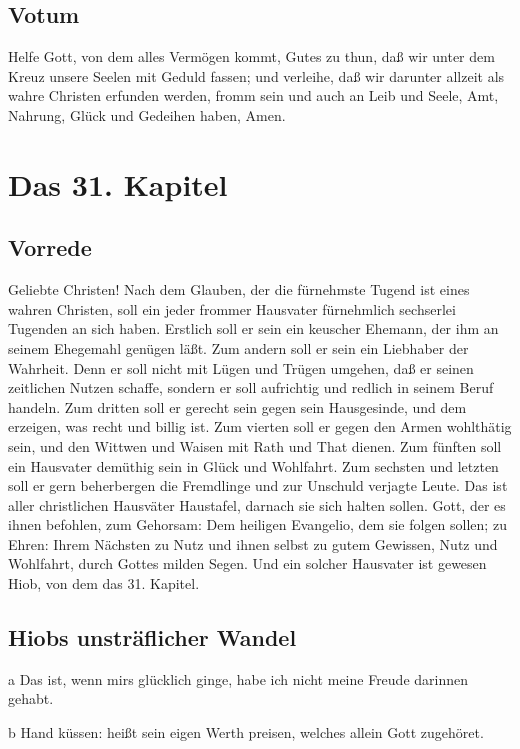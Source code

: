 \section{Votum}

Helfe Gott, von dem alles Vermögen kommt, Gutes zu thun, daß wir unter dem Kreuz unsere Seelen mit Geduld fassen; und verleihe, daß wir darunter allzeit als wahre Christen erfunden werden, fromm sein und auch an Leib und Seele, Amt, Nahrung, Glück und Gedeihen haben, Amen.

\chapter{Das 31. Kapitel}

\section{Vorrede}

Geliebte Christen! Nach dem Glauben, der die fürnehmste Tugend ist eines wahren Christen, soll ein jeder frommer Hausvater fürnehmlich sechserlei Tugenden an sich haben. Erstlich soll er sein ein keuscher Ehemann, der ihm an seinem Ehegemahl genügen läßt. Zum andern soll er sein ein Liebhaber der Wahrheit. Denn er soll nicht mit Lügen und Trügen umgehen, daß er seinen zeitlichen Nutzen schaffe, sondern er soll aufrichtig und redlich in seinem Beruf handeln. Zum dritten soll er gerecht sein gegen sein Hausgesinde, und dem erzeigen, was recht und billig ist. Zum vierten soll er gegen den Armen wohlthätig sein, und den Wittwen und Waisen mit Rath und That dienen. Zum fünften soll ein Hausvater demüthig sein in Glück und Wohlfahrt. Zum sechsten und letzten soll er gern beherbergen die Fremdlinge und zur Unschuld verjagte Leute. Das ist aller christlichen Hausväter Haustafel, darnach sie sich halten sollen. Gott, der es ihnen befohlen, zum Gehorsam: Dem heiligen Evangelio, dem sie folgen sollen; zu Ehren: Ihrem Nächsten zu Nutz und ihnen selbst zu gutem Gewissen, Nutz und Wohlfahrt, durch Gottes milden Segen. Und ein solcher Hausvater ist gewesen Hiob, von dem das 31. Kapitel.

\section{Hiobs unsträflicher Wandel}

a Das ist, wenn mirs glücklich ginge, habe ich nicht meine Freude darinnen gehabt.

b Hand küssen: heißt sein eigen Werth preisen, welches allein Gott zugehöret.

